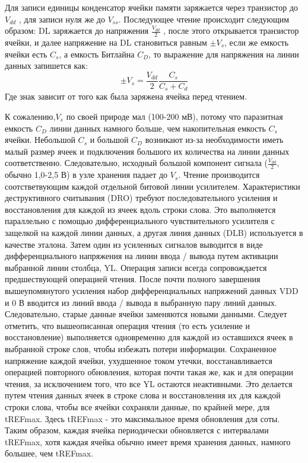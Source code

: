 \documentclass[a4paper,12pt]{article} %
\begin{document}
Для записи единицы конденсатор ячейки памяти заряжается через транзистор  до $V_{dd} $ , для записи нуля же до $V_{ss}$. Последующее чтение происходит следующим образом: DL заряжается до напряжения $\frac{V_{dd}}{2} $ , после этого открывается транзистор ячейки, и далее напряжение на DL становиться равным $\pm V_s$, если же емкость ячейки есть $C_s$, а емкость Битлайна $C_D$, то выражение для напряжения на линии данных запишется как:
 $$\pm V_s =\frac{V_{dd}}{2}\frac{C_s}{C_s+C_d}  $$
 Где знак зависит от того как была заряжена ячейка перед чтением.


К сожалению,$V_s$  по своей природе мал (100-200 мВ), потому что паразитная емкость $C_D$ линии данных намного больше, чем накопительная емкость $C_s$ ячейки. Небольшой $C_s$ и большой $C_D$ возникают из-за необходимости иметь малый размер ячеек и подключения большого их количества на линии данных соответственно. Следовательно, исходный большой компонент сигнала ($\frac{V_{dd}}{2} $, обычно 1,0-2,5 В) в узле хранения падает до $V_s$. Чтение производится соотстветвующим каждой отдельной битовой линии усилителем.  Характеристики деструктивного считывания (DRO) требуют последовательного усиления и восстановления для каждой из ячеек вдоль строки слова. Это выполняется параллельно с помощью дифференциального чувствительного усилителя  с защелкой на каждой линии данных, а другая линия данных (DLB) используется в качестве эталона. Затем один из усиленных сигналов выводится в виде дифференциального напряжения на линии ввода / вывода путем активации выбранной линии столбца, YL.
Операция записи всегда сопровождается предшествующей операцией чтения. После почти полного завершения вышеупомянутого усиления набор дифференциальных напряжений данных VDD и 0 В вводится из линий ввода / вывода в выбранную пару линий данных. Следовательно, старые данные ячейки заменяются новыми данными. Следует отметить, что вышеописанная операция чтения (то есть усиление и восстановление) выполняется одновременно для каждой из оставшихся ячеек в выбранной строке слов, чтобы избежать потери информации.
Сохраненное напряжение каждой ячейки, ухудшенное током утечки, восстанавливается операцией повторного обновления, которая почти такая же, как и для операции чтения, за исключением того, что все YL остаются неактивными. Это делается путем чтения данных ячеек в строке слова и восстановления их для каждой строки слова, чтобы все ячейки сохраняли данные, по крайней мере, для tREFmax. Здесь tREFmax - это максимальное время обновления для соты. Таким образом, каждая ячейка периодически обновляется с интервалами tREFmax, хотя каждая ячейка обычно имеет время хранения данных, намного большее, чем tREFmax.
\end{document}
